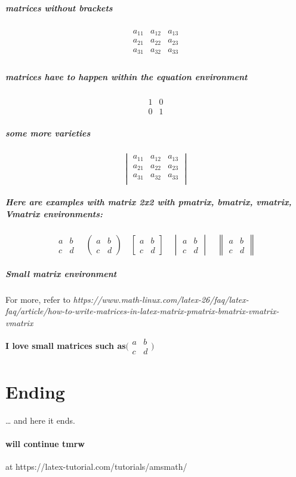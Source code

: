 \documentclass[a4paper, 12pt]{article}
\begin{document}
\subparagraph{matrices without brackets}
\begin{equation*}
   \begin{matrix} 
   a_{11} & a_{12} & a_{13}  \\
   a_{21} & a_{22} & a_{23}  \\
   a_{31} & a_{32} & a_{33}  \\
   \end{matrix} 
\end{equation*}

\subparagraph{matrices have to happen within the equation environment}
\begin{equation*}
\begin{matrix}
1 & 0\\
0 & 1
\end{matrix}
\end{equation*}

\subparagraph{some more varieties}
\begin{equation*}
   \begin{vmatrix} 
   a_{11} & a_{12} & a_{13}  \\
   a_{21} & a_{22} & a_{23}  \\
   a_{31} & a_{32} & a_{33}  \\
   \end{vmatrix} 
\end{equation*}

\subparagraph{Here are examples with matrix 2x2 with pmatrix, bmatrix, vmatrix, Vmatrix environments:}
\begin{equation*}
\begin{matrix} 
a & b \\
c & d 
\end{matrix}
\quad  %
\begin{pmatrix} 
a & b \\
c & d 
\end{pmatrix}
\quad
\begin{bmatrix} 
a & b \\
c & d 
\end{bmatrix}
\quad
\begin{vmatrix} 
a & b \\
c & d 
\end{vmatrix}
\quad
\begin{Vmatrix} 
a & b \\
c & d 
\end{Vmatrix}
\end{equation*}

\subparagraph{Small matrix environment} For more, refer to \textsl{https://www.math-linux.com/latex-26/faq/latex-faq/article/how-to-write-matrices-in-latex-matrix-pmatrix-bmatrix-vmatrix-vmatrix} \\
\begin{center}
\textbf{I love small matrices such as$\big(\begin{smallmatrix} a & b\\ c & d \end{smallmatrix}\big)$}
\end{center}


\section{Ending}
\ldots{} and here it ends.

\paragraph{will continue tmrw} at https://latex-tutorial.com/tutorials/amsmath/
\end{document}
